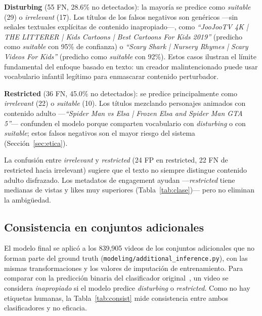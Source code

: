 \documentclass[conference]{IEEEtran}
\begin{document}
\textbf{Disturbing} (55 FN, 28.6\% no detectados): la mayoría se predice como \textit{suitable} (29) o \textit{irrelevant} (17). Los títulos de los falsos negativos son genéricos —sin señales textuales explícitas de contenido inapropiado—, como \emph{``JooJooTV 4K | THE LITTERER | Kids Cartoons | Best Cartoons For Kids 2019''} (predicho como \textit{suitable} con 95\% de confianza) o \emph{``Scary Shark | Nursery Rhymes | Scary Videos For Kids''} (predicho como \textit{suitable} con 92\%). Estos casos ilustran el límite fundamental del enfoque basado en texto: un creador malintencionado puede usar vocabulario infantil legítimo para enmascarar contenido perturbador.

\textbf{Restricted} (36 FN, 45.0\% no detectados): se predice principalmente como \textit{irrelevant} (22) o \textit{suitable} (10). Los títulos mezclando personajes animados con contenido adulto —\emph{``Spider Man vs Elsa | Frozen Elsa and Spider Man GTA 5''}— confunden el modelo porque comparten vocabulario con \textit{disturbing} o con \textit{suitable}; estos falsos negativos son el mayor riesgo del sistema (Sección~\ref{sec:etica}).

La confusión entre \textit{irrelevant} y \textit{restricted} (24 FP en restricted, 22 FN de restricted hacia irrelevant) sugiere que el texto no siempre distingue contenido adulto disfrazado. Los metadatos de engagement ayudan —\textit{restricted} tiene medianas de vistas y likes muy superiores (Tabla~\ref{tab:clase})— pero no eliminan la ambigüedad.

\subsection{Consistencia en conjuntos adicionales}\label{sec:consistencia}
El modelo final se aplicó a los 839,905 videos de los conjuntos adicionales que no forman parte del ground truth (\texttt{modeling/additional\_inference.py}), con las mismas transformaciones y los valores de imputación de entrenamiento. Para comparar con la predicción binaria del clasificador original~\cite{papadamou}, un video se considera \textit{inapropiado} si el modelo predice \textit{disturbing} o \textit{restricted}. Como no hay etiquetas humanas, la Tabla~\ref{tab:consist} mide consistencia entre ambos clasificadores y no eficacia.
\end{document}
